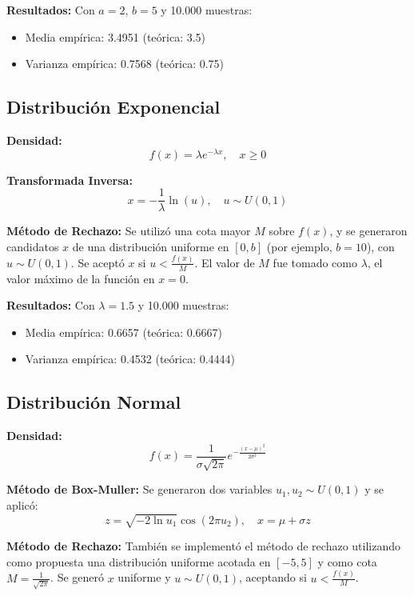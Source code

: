 \documentclass{article}
\begin{document}
\textbf{Resultados:} Con $a=2$, $b=5$ y 10.000 muestras:
\begin{itemize}
\item Media empírica: 3.4951 (teórica: 3.5)
\item Varianza empírica: 0.7568 (teórica: 0.75)
\end{itemize}

\subsection{Distribución Exponencial}
\textbf{Densidad:}
\begin{equation}
f(x) = \lambda e^{-\lambda x}, \quad x \geq 0
\end{equation}

\textbf{Transformada Inversa:}
\begin{equation}
x = -\frac{1}{\lambda} \ln(u), \quad u \sim U(0,1)
\end{equation}

\textbf{Método de Rechazo:} Se utilizó una cota mayor $M$ sobre $f(x)$, y se generaron candidatos $x$ de una distribución uniforme en $[0, b]$ (por ejemplo, $b = 10$), con $u \sim U(0,1)$. Se aceptó $x$ si $u < \frac{f(x)}{M}$. El valor de $M$ fue tomado como $\lambda$, el valor máximo de la función en $x=0$.

\textbf{Resultados:} Con $\lambda = 1.5$ y 10.000 muestras:
\begin{itemize}
\item Media empírica: 0.6657 (teórica: 0.6667)
\item Varianza empírica: 0.4532 (teórica: 0.4444)
\end{itemize}

\subsection{Distribución Normal}
\textbf{Densidad:}
\begin{equation}
f(x) = \frac{1}{\sigma \sqrt{2\pi}} e^{-\frac{(x - \mu)^2}{2\sigma^2}}
\end{equation}

\textbf{Método de Box-Muller:} Se generaron dos variables $u_1, u_2 \sim U(0,1)$ y se aplicó:
\begin{equation}
z = \sqrt{-2 \ln u_1} \cos(2\pi u_2), \quad x = \mu + \sigma z
\end{equation}

\textbf{Método de Rechazo:} También se implementó el método de rechazo utilizando como propuesta una distribución uniforme acotada en $[-5,5]$ y como cota $M = \frac{1}{\sqrt{2\pi}}$. Se generó $x$ uniforme y $u \sim U(0,1)$, aceptando si $u < \frac{f(x)}{M}$.
\end{document}
